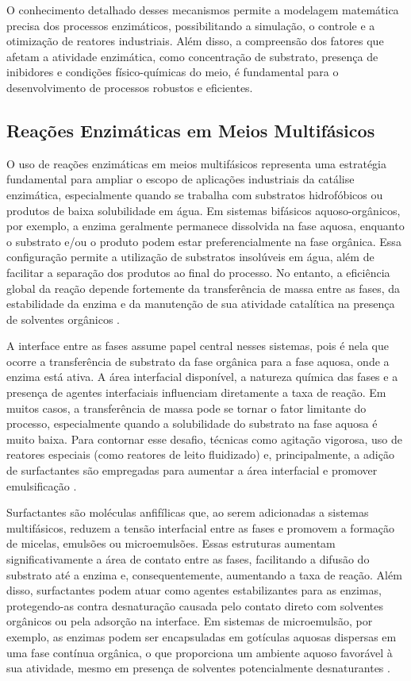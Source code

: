 \documentclass[12pt,oneside]{report}
\begin{document}
O conhecimento detalhado desses mecanismos permite a modelagem matemática precisa dos processos enzimáticos, possibilitando a simulação, o controle e a otimização de reatores industriais. Além disso, a compreensão dos fatores que afetam a atividade enzimática, como concentração de substrato, presença de inibidores e condições físico-químicas do meio, é fundamental para o desenvolvimento de processos robustos e eficientes.

\subsection{Reações Enzimáticas em Meios Multifásicos}

O uso de reações enzimáticas em meios multifásicos representa uma estratégia fundamental para ampliar o escopo de aplicações industriais da catálise enzimática, especialmente quando se trabalha com substratos hidrofóbicos ou produtos de baixa solubilidade em água. Em sistemas bifásicos aquoso-orgânicos, por exemplo, a enzima geralmente permanece dissolvida na fase aquosa, enquanto o substrato e/ou o produto podem estar preferencialmente na fase orgânica. Essa configuração permite a utilização de substratos insolúveis em água, além de facilitar a separação dos produtos ao final do processo. No entanto, a eficiência global da reação depende fortemente da transferência de massa entre as fases, da estabilidade da enzima e da manutenção de sua atividade catalítica na presença de solventes orgânicos \cite{schmid2002enzyme}.

A interface entre as fases assume papel central nesses sistemas, pois é nela que ocorre a transferência de substrato da fase orgânica para a fase aquosa, onde a enzima está ativa. A área interfacial disponível, a natureza química das fases e a presença de agentes interfaciais influenciam diretamente a taxa de reação. Em muitos casos, a transferência de massa pode se tornar o fator limitante do processo, especialmente quando a solubilidade do substrato na fase aquosa é muito baixa. Para contornar esse desafio, técnicas como agitação vigorosa, uso de reatores especiais (como reatores de leito fluidizado) e, principalmente, a adição de surfactantes são empregadas para aumentar a área interfacial e promover emulsificação \cite{schmid2002enzyme}.

Surfactantes são moléculas anfifílicas que, ao serem adicionadas a sistemas multifásicos, reduzem a tensão interfacial entre as fases e promovem a formação de micelas, emulsões ou microemulsões. Essas estruturas aumentam significativamente a área de contato entre as fases, facilitando a difusão do substrato até a enzima e, consequentemente, aumentando a taxa de reação. Além disso, surfactantes podem atuar como agentes estabilizantes para as enzimas, protegendo-as contra desnaturação causada pelo contato direto com solventes orgânicos ou pela adsorção na interface. Em sistemas de microemulsão, por exemplo, as enzimas podem ser encapsuladas em gotículas aquosas dispersas em uma fase contínua orgânica, o que proporciona um ambiente aquoso favorável à sua atividade, mesmo em presença de solventes potencialmente desnaturantes \cite{lau2010surfactants}.
\end{document}
